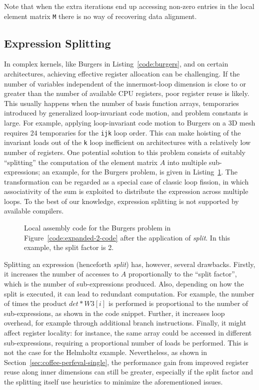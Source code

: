 Note that when the extra iterations end up accessing non-zero entries in the local element matrix \texttt{M} there is no way of recovering data alignment.

\subsection{Expression Splitting}
\label{sec:coffee-split}

In complex kernels, like Burgers in Listing~\ref{code:burgers}, and on certain architectures, achieving effective register allocation can be challenging. If the number of variables independent of the innermost-loop dimension is close to or greater than the number of available CPU registers, poor register reuse is likely. This usually happens when the number of basis function arrays, temporaries introduced by generalized loop-invariant code motion, and problem constants is large. For example, applying loop-invariant code motion to Burgers on a 3D mesh requires 24 temporaries for the \texttt{ijk} loop order. This can make hoisting of the invariant loads out of the \texttt{k} loop inefficient on architectures with a relatively low number of registers. One potential solution to this problem consists of suitably ``splitting'' the computation of the element matrix $A$ into multiple sub-expressions; an example, for the Burgers problem, is given in Listing~\ref{code:burgers-split}. The transformation can be regarded as a special case of classic loop fission, in which associativity of the sum is exploited to distribute the expression across multiple loops. To the best of our knowledge, expression splitting is not supported by available compilers.

\begin{figure}
\centering
\label{code:burgers-split}
\scriptsize

\caption{Local assembly code for the Burgers problem in Figure~\ref{code:expanded-2-code} after the application of \emph{split}. In this example, the split factor is 2.}
\end{figure}

Splitting an expression (henceforth \emph{split}) has, however, several drawbacks. Firstly, it increases the number of accesses to $A$ proportionally to the ``split factor'', which is the number of sub-expressions produced. Also, depending on how the split is executed, it can lead to redundant computation. For example, the number of times the product $det*W3[i]$ is performed is proportional to the number of sub-expressions, as shown in the code snippet. Further, it increases loop overhead, for example
through additional branch instructions. Finally, it might affect register locality: for instance, the same array could be accessed in different sub-expressions, requiring a proportional number of loads be performed. This is not the case for the Helmholtz example. Nevertheless, as shown in Section~\ref{sec:coffee-perfeval-single}, the performance gain from improved register reuse along inner dimensions can still be greater, especially if the split factor and the splitting itself use heuristics to minimize the aforementioned issues.

